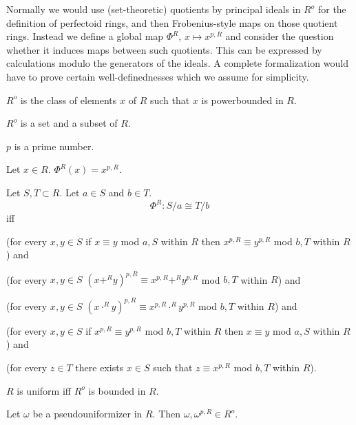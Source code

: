 \documentclass{article}
\begin{document}
Normally we would use (set-theoretic) quotients by principal ideals in $R^o$
for the definition of perfectoid rings, and then Frobenius-style maps on
those quotient rings.
Instead we define a global map $\Phi^R$, $x \mapsto x^{p,R}$ and consider the
question whether it induces maps between such quotients. This
can be expressed by calculations modulo the generators of the ideals.
A complete formalization would have to prove certain well-definednesses
which we assume for simplicity.

\begin{forthel}
  \begin{definition}
    $R^o$ is the class of elements $x$ of $R$ such that $x$ is powerbounded in $R$.
  \end{definition}

  \begin{axiom}
    $R^o$ is a set and a subset of $R$.
  \end{axiom}

  \begin{signature}
    $p$ is a prime number.
  \end{signature}

  \begin{definition}
    Let $x \in R$.
    $\Phi^{R}(x) = x^{p,R}$.
  \end{definition}

  \begin{definition}
    Let $S,T \subset R$.
    Let $a \in S$ and $b \in T$.
    \[ \Phi^{R} : S / a \cong T / b \] iff

    (for every $x,y \in S$ if $x \equiv y$ mod $a,S$ within $R$ then $x^{p,R} \equiv y^{p,R}$ mod $b,T$ within $R$) and

    (for every $x,y \in S$ $ (x +^{R} y)^{p,R} \equiv x^{p,R} +^{R} y^{p,R}$ mod $b,T$ within $R$) and

    (for every $x,y \in S$ $ (x \cdot^{R} y)^{p,R} \equiv x^{p,R} \cdot^{R} y^{p,R}$ mod $b,T$ within $R$) and

    (for every $x,y \in S$ if
    $x^{p,R} \equiv y^{p,R}$ mod $b,T$ within $R$ then $x \equiv y$ mod $a,S$ within $R$) and

    (for every $z \in T$ there exists $x \in S$ such that $z \equiv x^{p,R}$ mod $b,T$ within $R$).
  \end{definition}


  \begin{definition}
    $R$ is uniform iff $R^o$ is bounded in $R$.
  \end{definition}

  \begin{axiom}
    Let $\omega$ be a pseudouniformizer in $R$.
    Then $\omega, \omega^{p,R} \in R^o$.
  \end{axiom}
\end{forthel}
\end{document}
